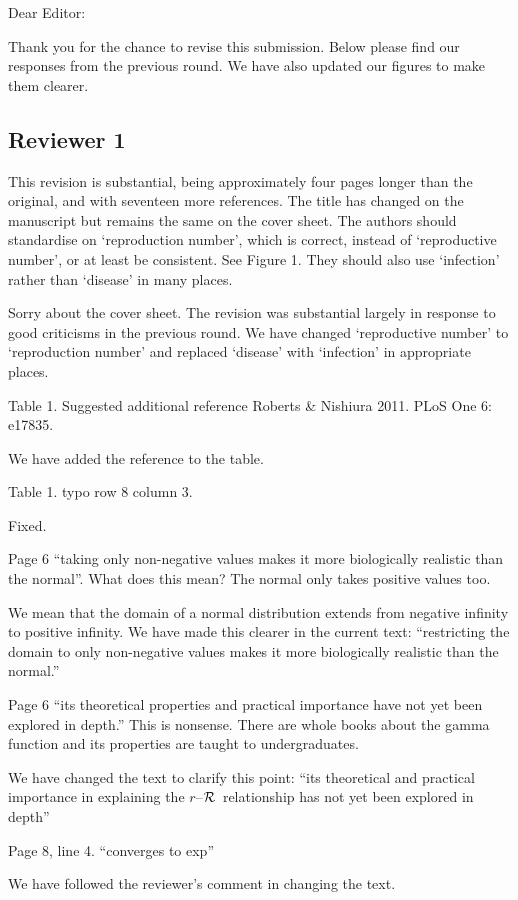 \documentclass[12pt]{article}
\newcommand{\rR}{\mbox{$r$--$\cal R$}}
\newcommand{\rev}{\subsection*}
\newcommand{\revtext}{\textsf}
\begin{document}
\noindent Dear Editor:

Thank you for the chance to revise this submission. 
Below please find our responses from the previous round.
We have also updated our figures to make them clearer.

\rev{Reviewer 1}

\revtext{This revision is substantial, being approximately four pages longer than the
original, and with seventeen more references. The title has changed on the
manuscript but remains the same on the cover sheet. The authors should
standardise on ‘reproduction number’, which is correct, instead of ‘reproductive
number’, or at least be consistent. See Figure 1. They should also use ‘infection’
rather than ‘disease’ in many places.}

Sorry about the cover sheet. The revision was substantial largely in response to good criticisms in the previous round.
We have changed `reproductive number' to `reproduction number' and replaced `disease' with `infection' in appropriate places.

\revtext{Table 1. Suggested additional reference Roberts \& Nishiura 2011. PLoS One 6: e17835.}

We have added the reference to the table.

\revtext{Table 1. typo row 8 column 3.}

Fixed.

\revtext{Page 6 “taking only non-negative values makes it more biologically realistic than the normal”. What does this mean? The normal only takes positive values too.}

We mean that the domain of a normal distribution extends from negative infinity to positive infinity.
We have made this clearer in the current text: ``restricting the domain to only non-negative values makes it more biologically realistic than the normal.''

\revtext{Page 6 “its theoretical properties and practical importance have not yet been explored in depth.” This is nonsense. There are whole books about the gamma function and its properties are taught to undergraduates.}

We have changed the text to clarify this point: ``its theoretical and practical importance in explaining the \rR\ relationship has not yet been explored in depth''

\revtext{Page 8, line 4. “converges to exp”}

We have followed the reviewer's comment in changing the text.
\end{document}
